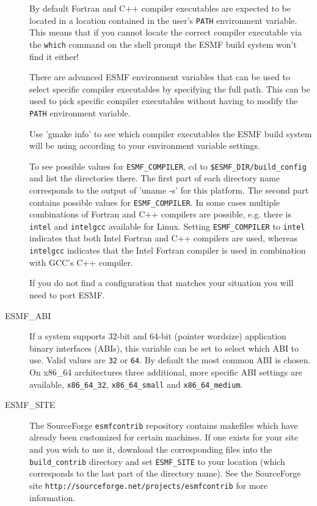 \begin{description}
By default Fortran and C++ compiler executables are expected to be located in
a location contained in the user's {\tt PATH} environment variable. This means
that if you cannot locate the correct compiler executable via the {\tt which}
command on the shell prompt the ESMF build system won't find it either!

There are advanced ESMF environment variables that can be used to select 
specific compiler executables by specifying the full path. This can be used to
pick specific compiler executables without having to modify the {\tt PATH}
environment variable.

Use 'gmake info' to see which compiler executables the ESMF build system will
be using according to your environment variable settings.

To see possible values for {\tt ESMF\_COMPILER}, cd to 
{\tt \$ESMF\_DIR/build\_config} and list the directories there. The first part 
of each directory name corresponds to the output of 'uname -s' for this 
platform. The second part contains possible values for {\tt ESMF\_COMPILER}. In
some cases multiple combinations of Fortran and C++ compilers are possible, e.g.
there is {\tt intel} and {\tt intelgcc} available for Linux. Setting 
{\tt ESMF\_COMPILER} to {\tt intel} indicates that both Intel Fortran and 
C++ compilers are used, whereas {\tt intelgcc} indicates that the Intel Fortran
compiler is used in combination with GCC's C++ compiler.

If you do not find a configuration that matches your situation you will need to
port ESMF.

\item[ESMF\_ABI]
If a system supports 32-bit and 64-bit (pointer wordsize) application binary
interfaces (ABIs), this variable can be set to select which ABI to use. Valid 
values are {\tt 32} or {\tt 64}. By default the most common ABI is chosen. On
x86\_64 architectures three additional, more specific ABI settings are available,
{\tt x86\_64\_32}, {\tt x86\_64\_small} and {\tt x86\_64\_medium}.

\item[ESMF\_SITE]
The SourceForge {\tt esmfcontrib} repository contains makefiles which have 
already been customized for certain machines.  If one exists for your site 
and you wish to use it, download the corresponding files into the 
{\tt build\_contrib} directory and set {\tt ESMF\_SITE} to your location
(which corresponds to the last part of the directory name).  See the 
SourceForge site {\tt http://sourceforge.net/projects/esmfcontrib} for more 
information.


\end{description}
